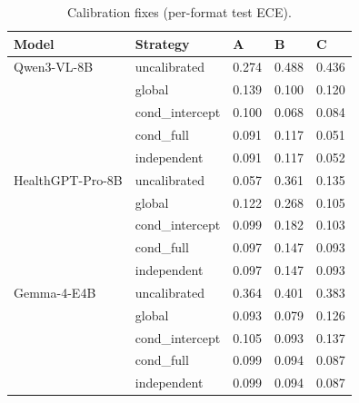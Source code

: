 \begin{table}[t]
\centering
\small
\caption{Calibration fixes (per-format test ECE).}
\label{tab:fix}
\begin{tabular}{lllll}
\toprule
Model & Strategy & A & B & C \\
\midrule
Qwen3-VL-8B & uncalibrated & 0.274 & 0.488 & 0.436 \\
 & global & 0.139 & 0.100 & 0.120 \\
 & cond_intercept & 0.100 & 0.068 & 0.084 \\
 & cond_full & 0.091 & 0.117 & 0.051 \\
 & independent & 0.091 & 0.117 & 0.052 \\
HealthGPT-Pro-8B & uncalibrated & 0.057 & 0.361 & 0.135 \\
 & global & 0.122 & 0.268 & 0.105 \\
 & cond_intercept & 0.099 & 0.182 & 0.103 \\
 & cond_full & 0.097 & 0.147 & 0.093 \\
 & independent & 0.097 & 0.147 & 0.093 \\
Gemma-4-E4B & uncalibrated & 0.364 & 0.401 & 0.383 \\
 & global & 0.093 & 0.079 & 0.126 \\
 & cond_intercept & 0.105 & 0.093 & 0.137 \\
 & cond_full & 0.099 & 0.094 & 0.087 \\
 & independent & 0.099 & 0.094 & 0.087 \\
\bottomrule
\end{tabular}
\end{table}
